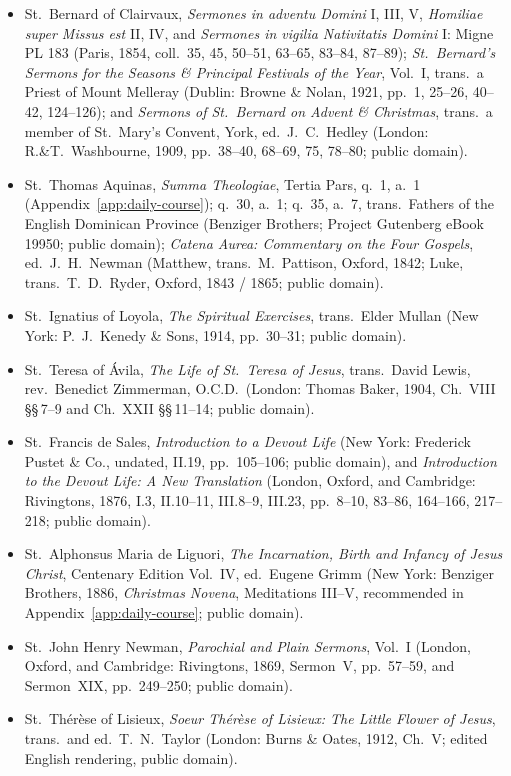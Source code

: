 \begin{itemize}
\item St.~Bernard of Clairvaux, \textit{Sermones in adventu Domini} I, III, V,
\textit{Homiliae super Missus est} II, IV, and \textit{Sermones in vigilia
Nativitatis Domini} I: Migne PL 183 (Paris, 1854, coll.~35, 45, 50--51, 63--65,
83--84, 87--89); \textit{St.~Bernard's Sermons for the Seasons \& Principal
Festivals of the Year}, Vol.~I, trans.\ a Priest of Mount Melleray (Dublin:
Browne \& Nolan, 1921, pp.~1, 25--26, 40--42, 124--126); and \textit{Sermons of
St.~Bernard on Advent \& Christmas}, trans.\ a member of St.~Mary's Convent,
York, ed.\ J.~C.~Hedley (London: R.\&T.~Washbourne, 1909, pp.~38--40, 68--69,
75, 78--80; public domain).
\item St.~Thomas Aquinas, \textit{Summa Theologiae}, Tertia Pars, q.~1, a.~1
(Appendix~\ref{app:daily-course}); q.~30, a.~1; q.~35, a.~7, trans.\ Fathers of
the English Dominican Province (Benziger Brothers; Project Gutenberg eBook
19950; public domain); \textit{Catena Aurea: Commentary on the Four Gospels},
ed.\ J.~H.~Newman (Matthew, trans.\ M.~Pattison, Oxford, 1842; Luke, trans.\
T.~D.~Ryder, Oxford, 1843 / 1865; public domain).
\item St.~Ignatius of Loyola, \textit{The Spiritual Exercises}, trans.\ Elder
Mullan (New York: P.~J.~Kenedy \& Sons, 1914, pp.~30--31; public domain).
\item St.~Teresa of \'Avila, \textit{The Life of St.~Teresa of Jesus}, trans.\
David Lewis, rev.\ Benedict Zimmerman, O.C.D.\ (London: Thomas Baker, 1904,
Ch.~VIII \S\S\,7--9 and Ch.~XXII \S\S\,11--14; public domain).
\item St.~Francis de Sales, \textit{Introduction to a Devout Life} (New York:
Frederick Pustet \& Co., undated, II.19, pp.~105--106; public domain), and
\textit{Introduction to the Devout Life: A New Translation} (London, Oxford,
and Cambridge: Rivingtons, 1876, I.3, II.10--11, III.8--9, III.23, pp.~8--10,
83--86, 164--166, 217--218; public domain).
\item St.~Alphonsus Maria de Liguori, \textit{The Incarnation, Birth and
Infancy of Jesus Christ}, Centenary Edition Vol.~IV, ed.\ Eugene Grimm (New
York: Benziger Brothers, 1886, \textit{Christmas Novena}, Meditations III--V,
recommended in Appendix~\ref{app:daily-course}; public domain).
\item St.~John Henry Newman, \textit{Parochial and Plain Sermons}, Vol.~I
(London, Oxford, and Cambridge: Rivingtons, 1869, Sermon~V, pp.~57--59, and
Sermon~XIX, pp.~249--250; public domain).
\item St.~Th\'er\`ese of Lisieux, \textit{Soeur Th\'er\`ese of Lisieux: The
Little Flower of Jesus}, trans.\ and ed.\ T.~N.~Taylor (London: Burns \& Oates,
1912, Ch.~V; edited English rendering, public domain).
\end{itemize}
